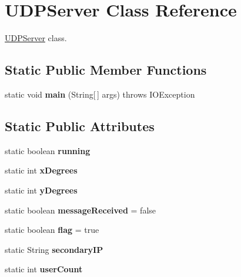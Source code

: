 \hypertarget{class_u_d_p_server}{}\section{U\+D\+P\+Server Class Reference}
\label{class_u_d_p_server}


\hyperlink{class_u_d_p_server}{U\+D\+P\+Server} class.  


\subsection*{Static Public Member Functions}
\begin{DoxyCompactItemize}
\item 
static void {\bfseries main} (String\mbox{[}$\,$\mbox{]} args)  throws I\+O\+Exception\hypertarget{class_u_d_p_server_a02e0cce3658b00026dc771ea5ef2c345}{}\label{class_u_d_p_server_a02e0cce3658b00026dc771ea5ef2c345}

\end{DoxyCompactItemize}
\subsection*{Static Public Attributes}
\begin{DoxyCompactItemize}
\item 
static boolean {\bfseries running}\hypertarget{class_u_d_p_server_a4ea441d611623c0c772dd672f2dbdee8}{}\label{class_u_d_p_server_a4ea441d611623c0c772dd672f2dbdee8}

\item 
static int {\bfseries x\+Degrees}\hypertarget{class_u_d_p_server_a688dd8ca331852530eb2512ce84fa97c}{}\label{class_u_d_p_server_a688dd8ca331852530eb2512ce84fa97c}

\item 
static int {\bfseries y\+Degrees}\hypertarget{class_u_d_p_server_a79f1b6e14ce248b34f241fde2908a17c}{}\label{class_u_d_p_server_a79f1b6e14ce248b34f241fde2908a17c}

\item 
static boolean {\bfseries message\+Received} = false\hypertarget{class_u_d_p_server_aec0aecab61ce5f57b5642cc5fa2cc52c}{}\label{class_u_d_p_server_aec0aecab61ce5f57b5642cc5fa2cc52c}

\item 
static boolean {\bfseries flag} = true\hypertarget{class_u_d_p_server_a35aa40c2624191ef9f0e00d8500c3f3a}{}\label{class_u_d_p_server_a35aa40c2624191ef9f0e00d8500c3f3a}

\item 
static String {\bfseries secondary\+IP}\hypertarget{class_u_d_p_server_adac7169a538dfe95223b9db39dacdaf5}{}\label{class_u_d_p_server_adac7169a538dfe95223b9db39dacdaf5}

\item 
static int {\bfseries user\+Count}\hypertarget{class_u_d_p_server_aa5e77770fdd1b55bb63f3252d4881170}{}\label{class_u_d_p_server_aa5e77770fdd1b55bb63f3252d4881170}

\end{DoxyCompactItemize}


